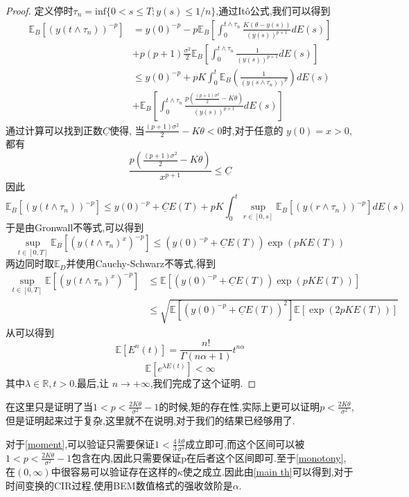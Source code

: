 \begin{proof}
	定义停时$\tau_{n}=\mathrm{inf}\{0<s\leq T;y(s)\leq1/n\}$,通过It\^{o}公式,我们可以得到
	$$\begin{aligned}
		\mathbb{E}_B\left[(y(t\wedge\tau_{n}))^{-p}\right] &=y(0)^{-p}-p\mathbb{E}_B\left[\int_{0}^{t\wedge\tau_{n}}\frac{K(\theta-y(s))}{(y(s))^{p+1}}dE(s)\right]\\
		&+p(p+1)\frac{\sigma^{2}}{2}\mathbb{E}_B\left[\int_{0}^{t\wedge\tau_{n}}\frac{1}{(y(s))^{p+1}}dE(s)\right] \\
		&\leq y(0)^{-p}+pK\int_{0}^{t}\mathbb{E}_B\left(\frac{1}{(y(s\wedge\tau_{n}))^{p}}
		\right)dE(s) \\
		&+\mathbb{E}_B\left[\int_0^{t\wedge\tau_n}\frac{p\left(\frac{(p+1)\sigma^2}{2}-K\theta\right)}{(y(s))^{p+1}}dE(s)\right]
	\end{aligned}$$
	通过计算可以找到正数$\underline C$使得, 当$\frac{(p+1)\sigma^2}{2}-K\theta<0$时,对于任意的 $y(0)=x>0$,都有
	$$\frac{p\left(\frac{(p+1)\sigma^2}{2}-K\theta\right)}{x^{p+1}}\leq \underline C$$
	因此
	$$\mathbb{E}_B\left[(y(t\wedge\tau_n))^{-p}\right]\leq y(0)^{-p}+\underline{C}E(T)+pK\int_0^t\sup_{r\in[0,s]}\mathbb{E}_B\left[(y(r\wedge\tau_n))^{-p}\right]dE(s)$$
	于是由Gronwall不等式,可以得到
	$$\sup\limits_{t\in[0,T]}\mathbb{E}_B\left[(y(t\wedge\tau_n)^x)^{-p}\right]\leq\left(y(0)^{-p}+\underline{C}E(T)\right)\exp(pKE(T))$$
	两边同时取$\mathbb{E}_D$并使用Cauchy-Schwarz不等式,得到
	$$\begin{aligned}
		\sup\limits_{t\in[0,T]}\mathbb{E}\left[(y(t\wedge\tau_n)^x)^{-p}\right]&\leq\mathbb{E}\left[\left(y(0)^{-p}+\underline{C}E(T)\right)\exp(pKE(T))\right]\\
		&\leq\sqrt{\mathbb{E}\left[\left(y(0)^{-p}+\underline{C}E(T)\right)^2\right]\mathbb{E}\left[\exp(2pKE(T))\right]}
	\end{aligned}$$
	从\cite{jum2014strong}可以得到
	\begin{equation}
		\mathbb{E}[E^n(t)]=\frac{n!}{\Gamma(n\alpha+1)}t^{n\alpha}
	\end{equation}
	\begin{equation}
		\mathbb{E}[e^{\lambda E(t)}]<\infty
	\end{equation}
	其中$\lambda \in \mathbb{R},t>0$.最后,让 $n\to+\infty$,我们完成了这个证明.
\end{proof}
\begin{remark}
	在这里只是证明了当$1<p<\frac{2K\theta}{\sigma^2}-1$的时候,矩的存在性,实际上更可以证明$p<\frac{2K\theta}{\sigma^2}$,但是证明起来过于复杂,这里就不在说明,对于我们的结果已经够用了.
\end{remark}
对于\cref{moment},可以验证只需要保证$1 < \frac{4}{3}\frac{k\theta}{\sigma^2}$成立即可,而这个区间可以被$1<p<\frac{2K\theta}{\sigma^2}-1$包含在内,因此只需要保证p在后者这个区间即可.至于\cref{monotony},在$(0,\infty)$中很容易可以验证存在这样的$\kappa$使之成立.因此由\cref{main th}可以得到,对于时间变换的CIR过程,使用BEM数值格式的强收敛阶是$\alpha$.

